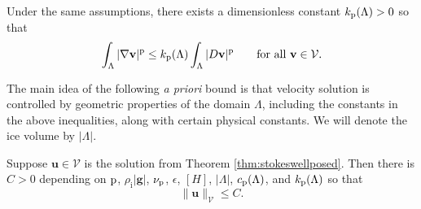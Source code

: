 \documentclass[hidelinks,onefignum,onetabnum,final]{siamart220329}  %
\newcommand{\eps}{\epsilon}
\newcommand{\grad}{\nabla}
\newcommand{\bg}{\mathbf{g}}
\newcommand{\bu}{\mathbf{u}}
\newcommand{\bv}{\mathbf{v}}
\newcommand{\cV}{\mathcal{V}}
\newcommand{\pp}{{\text{\textnormal{p}}}}
\newcommand{\rhoi}{\rho_{\text{i}}}
\begin{document}
\begin{lemma} \label{lem:korns}
Under the same assumptions, there exists a dimensionless constant $k_{\pp}(\Lambda)>0$ so that
\begin{equation}
\int_\Lambda |\grad\bv|^\pp \le k_{\pp}(\Lambda) \int_\Lambda |D\bv|^\pp \qquad \text{for all } \bv \in \cV. \label{eq:korns}
\end{equation}
\end{lemma}

The main idea of the following \emph{a priori} bound is that velocity solution is controlled by geometric properties of the domain $\Lambda$, including the constants in the above inequalities, along with certain physical constants.  We will denote the ice volume by $|\Lambda|$.

\begin{lemma} \label{lem:stokesapriori}
Suppose $\bu\in\cV$ is the solution from Theorem \ref{thm:stokeswellposed}.  Then there is $C>0$ depending on $\pp$, $\rhoi |\bg|$, $\nu_\pp$, $\eps$, $[H]$, $|\Lambda|$, $c_\pp(\Lambda)$, and $k_\pp(\Lambda)$ so that
\begin{equation}
\|\bu\|_{\cV} \le C. \label{eq:stokesapriori}
\end{equation}
\end{lemma}
\end{document}
